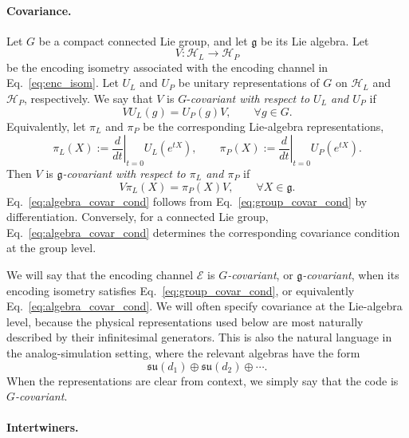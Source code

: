 \documentclass[10pt,twocolumn,superscriptaddress,aps,amsmath,amssymb,citeautoscript,floatfix,prx,longbibliography]{revtex4-2}
\newcounter{alg}
\theoremstyle{plain}
\theoremstyle{plain}
\theoremstyle{plain}
\theoremstyle{plain}
\theoremstyle{plain}
\theoremstyle{plain}
\begin{document}
\paragraph{Covariance.}

Let $G$ be a compact connected Lie group, and let $\mathfrak g$ be its Lie algebra. Let
$$
V:\mathcal H_L\to\mathcal H_P
$$
be the encoding isometry associated with the encoding channel in Eq.~\eqref{eq:enc_isom}. Let $U_L$ and $U_P$ be unitary representations of $G$ on $\mathcal H_L$ and $\mathcal H_P$, respectively. We say that $V$ is $G$-\textit{covariant with respect to $U_L$ and $U_P$} if
\begin{equation}\label{eq:group_covar_cond}
VU_L(g)
=
U_P(g)V,
\qquad
\forall g\in G .
\end{equation}
Equivalently, let $\pi_L$ and $\pi_P$ be the corresponding Lie-algebra representations,
$$
\pi_L(X)
:=
\left.\frac{d}{dt}\right|_{t=0}
U_L(e^{tX}),
\qquad
\pi_P(X)
:=
\left.\frac{d}{dt}\right|_{t=0}
U_P(e^{tX}).
$$
Then $V$ is \textit{$\mathfrak g$-covariant with respect to $\pi_L$ and $\pi_P$} if
\begin{equation}\label{eq:algebra_covar_cond}
V\pi_L(X)
=
\pi_P(X)V,
\qquad
\forall X\in\mathfrak g .
\end{equation}
Eq.~\eqref{eq:algebra_covar_cond} follows from Eq.~\eqref{eq:group_covar_cond} by differentiation. Conversely, for a connected Lie group, Eq.~\eqref{eq:algebra_covar_cond} determines the corresponding covariance condition at the group level.

We will say that the encoding channel $\mathcal E$ is \textit{$G$-covariant}, or \textit{$\mathfrak g$-covariant}, when its encoding isometry satisfies Eq.~\eqref{eq:group_covar_cond}, or equivalently Eq.~\eqref{eq:algebra_covar_cond}. We will often specify covariance at the Lie-algebra level, because the physical representations used below are most naturally described by their infinitesimal generators. This is also the natural language in the analog-simulation setting, where the relevant algebras have the form
$$
\mathfrak{su}(d_1)
\oplus
\mathfrak{su}(d_2)
\oplus
\cdots .
$$
When the representations are clear from context, we simply say that the code is \textit{$G$-covariant}.

\paragraph{Intertwiners.}
\end{document}
